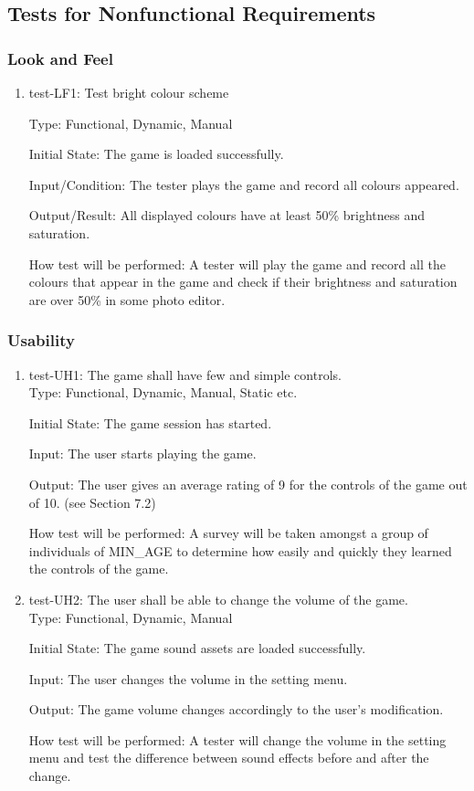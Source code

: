 \documentclass[12pt, titlepage]{article}
\begin{document}
\subsection{Tests for Nonfunctional Requirements}

\subsubsection{Look and Feel}
\begin{enumerate}

\item{test-LF1: Test bright colour scheme\\}

Type: Functional, Dynamic, Manual
					
Initial State: The game is loaded successfully.
					
Input/Condition: The tester plays the game and record all colours appeared.
					
Output/Result: All displayed colours have at least 50\% brightness and saturation.  
					
How test will be performed: A tester will play the game and record all the colours that appear in the game and check if their brightness and saturation are over 50\% in some photo editor.

\end{enumerate}

\subsubsection{Usability}
\begin{enumerate}
\item {test-UH1: The game shall have few and simple controls.\\}
Type: Functional, Dynamic, Manual, Static etc.
					
Initial State: The game session has started.
					
Input: The user starts playing the game.
					
Output: The user gives an average rating of 9 for the controls of the game out of 10. (see Section 7.2)
					
How test will be performed: A survey will be taken amongst a group of individuals of MIN\_AGE to determine how easily and quickly they learned the controls of the game. 

\item {test-UH2: The user shall be able to change the volume of the game.\\}
Type: Functional, Dynamic, Manual
					
Initial State: The game sound assets are loaded successfully.

Input: The user changes the volume in the setting menu.
					
Output: The game volume changes accordingly to the user's modification.
					
How test will be performed: A tester will change the volume in the setting menu and test the difference between sound effects before and after the change.

\end{enumerate}
\end{document}
